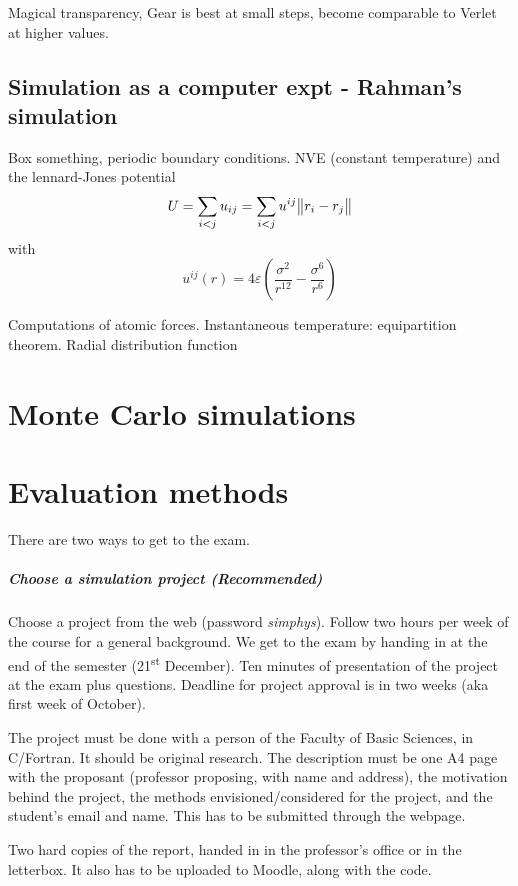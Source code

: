 \documentclass[palatino]{epflnotes}
\begin{document}
Magical transparency, Gear is best at small steps, become comparable to Verlet at higher values.

\section{Simulation as a computer expt - Rahman's simulation}

Box something, periodic boundary conditions. NVE (constant temperature) and the lennard-Jones potential \[ U = \sum_{i < j} u_{ij} = \sum_{i < j} u^{ij}\norm{r_i - r_j} \] with \[ u^{ij}(r) = 4ε \left(\frac{σ^2}{r^12} - \frac{σ^6}{r^6} \right)\]


Computations of atomic forces. Instantaneous temperature: equipartition theorem. Radial distribution function

\chapter{Monte Carlo simulations}

\appendix

\chapter{Evaluation methods}

There are two ways to get to the exam.

\paragraph{Choose a simulation project (Recommended)} Choose a project from the web (password \textit{simphys}). Follow two hours per week of the course for a general background. We get to the exam by handing in at the end of the semester (21\textsuperscript{st} December). Ten minutes of presentation of the project at the exam plus questions. Deadline for project approval is in two weeks (aka first week of October).

The project must be done with a person of the Faculty of Basic Sciences, in C/Fortran. It should be original research. The description must be one A4 page with the proposant (professor proposing, with name and address), the motivation behind the project, the methods envisioned/considered for the project, and the student's email and name. This has to be submitted through the webpage.

Two hard copies of the report, handed in in the professor's office or in the letterbox. It also has to be uploaded to Moodle, along with the code.
\end{document}
